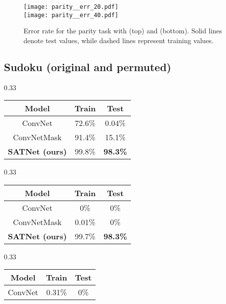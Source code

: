 \documentclass{article}
\begin{document}
	\begin{figure}
		\centering
		\texttt{[image: parity\_\_err\_20.pdf]} \\
		\texttt{[image: parity\_\_err\_40.pdf]}
		\caption{Error rate for the parity task with  (top) and  (bottom). Solid lines denote test values, while dashed lines represent training values.} 
		\label{fig:parity}
	\end{figure}
	
	\subsection{Sudoku (original and permuted)}
	\label{sec:sudoku}
	
	\begingroup
    \renewcommand*{\arraystretch}{1.2}
	\begin{table*}[t!]
	    \centering
	    \begin{subtable}[t]{0.33\textwidth}
        \centering
	    \begin{tabular}{ccc}
	    \toprule
	       \textbf{Model}  &  \textbf{Train} &  \textbf{Test} \\
	   \midrule
	       ConvNet & 72.6\% & 0.04\% \\
ConvNetMask & 91.4\% & 15.1\% \\
\textbf{SATNet (ours)}  & 99.8\% & \textbf{98.3\%}    \\
	   \bottomrule
	    \end{tabular}
	    \caption{Original Sudoku.}
	    \end{subtable}\begin{subtable}[t]{0.33\textwidth}
        \centering
	    \begin{tabular}{ccc}
	    \toprule
	       \textbf{Model}  &  \textbf{Train} &  \textbf{Test} \\
	   \midrule
	       ConvNet & 0\% & 0\% \\
ConvNetMask & 0.01\% & 0\% \\
\textbf{SATNet (ours)}  & 99.7\% &  \textbf{98.3\%}   \\
	   \bottomrule
	    \end{tabular}
	    \caption{Permuted Sudoku.}
	    \end{subtable}
	    \begin{subtable}[t]{0.33\textwidth}
        \centering
	    \begin{tabular}{ccc}
	    \toprule
	       \textbf{Model}  &  \textbf{Train} &  \textbf{Test} \\
	   \midrule
	       ConvNet & 0.31\% & 0\% \\

\end{tabular}
\end{subtable}
\end{table*}
\end{document}
